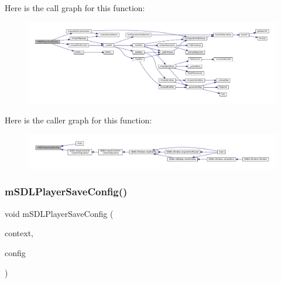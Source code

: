 Here is the call graph for this function\+:
\nopagebreak
\begin{figure}[H]
\begin{center}
\leavevmode
\includegraphics[width=350pt]{sdl-events_8c_a2e6e0f34192ea8c75aaa522b1cd8ccf6_cgraph}
\end{center}
\end{figure}
Here is the caller graph for this function\+:
\nopagebreak
\begin{figure}[H]
\begin{center}
\leavevmode
\includegraphics[width=350pt]{sdl-events_8c_a2e6e0f34192ea8c75aaa522b1cd8ccf6_icgraph}
\end{center}
\end{figure}
\mbox{\label{sdl-events_8c_a337054256f6cb4160128bdfe03bfe3e1}} 
\subsubsection{\texorpdfstring{m\+S\+D\+L\+Player\+Save\+Config()}{mSDLPlayerSaveConfig()}}
{\footnotesize\ttfamily void m\+S\+D\+L\+Player\+Save\+Config (\begin{DoxyParamCaption}\item[{const struct \mbox{\hyperlink{sdl-events_8h_structm_s_d_l_player}{m\+S\+D\+L\+Player}} $\ast$}]{context,  }\item[{struct Configuration $\ast$}]{config }\end{DoxyParamCaption})}

